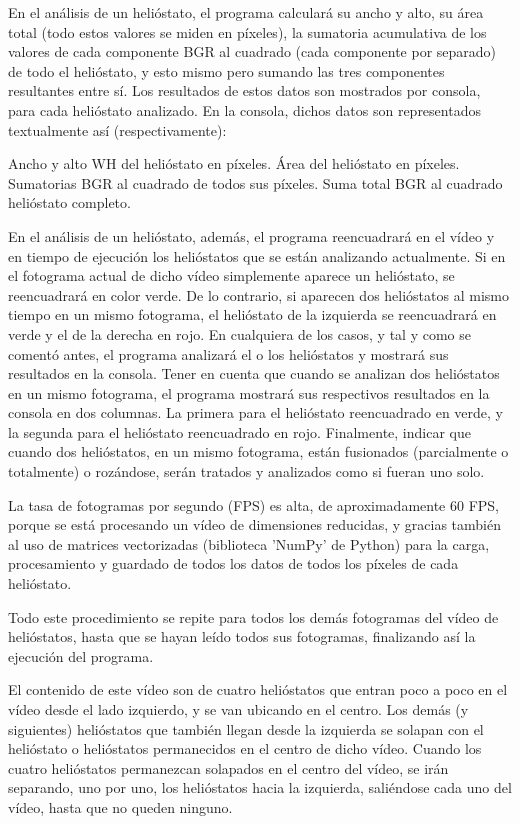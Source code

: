 \documentclass[12pt]{article}
\begin{document}
En el análisis de un helióstato, el programa calculará su ancho y alto, su área total (todo estos valores se miden en píxeles), la sumatoria acumulativa de los valores de cada componente BGR al cuadrado (cada componente por separado) de todo el helióstato, y esto mismo pero sumando las tres componentes resultantes entre sí. Los resultados de estos datos son mostrados por consola, para cada helióstato analizado. En la consola, dichos datos son representados textualmente así (respectivamente):

Ancho y alto WH del helióstato en píxeles.
Área del helióstato en píxeles.
Sumatorias BGR al cuadrado de todos sus píxeles.
Suma total BGR al cuadrado helióstato completo.

En el análisis de un helióstato, además, el programa reencuadrará en el vídeo y en tiempo de ejecución los helióstatos que se están analizando actualmente. Si en el fotograma actual de dicho vídeo simplemente aparece un helióstato, se reencuadrará en color verde. De lo contrario, si aparecen dos helióstatos al mismo tiempo en un mismo fotograma, el helióstato de la izquierda se reencuadrará en verde y el de la derecha en rojo. En cualquiera de los casos, y tal y como se comentó antes, el programa analizará el o los helióstatos y mostrará sus resultados en la consola. Tener en cuenta que cuando se analizan dos helióstatos en un mismo fotograma, el programa mostrará sus respectivos resultados en la consola en dos columnas. La primera para el helióstato reencuadrado en verde, y la segunda para el helióstato reencuadrado en rojo. Finalmente, indicar que cuando dos helióstatos, en un mismo fotograma, están fusionados (parcialmente o totalmente) o rozándose, serán tratados y analizados como si fueran uno solo.

La tasa de fotogramas por segundo (FPS) es alta, de aproximadamente 60 FPS, porque se está procesando un vídeo de dimensiones reducidas, y gracias también al uso de matrices vectorizadas (biblioteca 'NumPy' de Python) para la carga, procesamiento y guardado de todos los datos de todos los píxeles de cada helióstato.

Todo este procedimiento se repite para todos los demás fotogramas del vídeo de helióstatos, hasta que se hayan leído todos sus fotogramas, finalizando así la ejecución del programa.

El contenido de este vídeo son de cuatro helióstatos que entran poco a poco en el vídeo desde el lado izquierdo, y se van ubicando en el centro. Los demás (y siguientes) helióstatos que también llegan desde la izquierda se solapan con el helióstato o helióstatos permanecidos en el centro de dicho vídeo. Cuando los cuatro helióstatos permanezcan solapados en el centro del vídeo, se irán separando, uno por uno, los helióstatos hacia la izquierda, saliéndose cada uno del vídeo, hasta que no queden ninguno.
\end{document}
